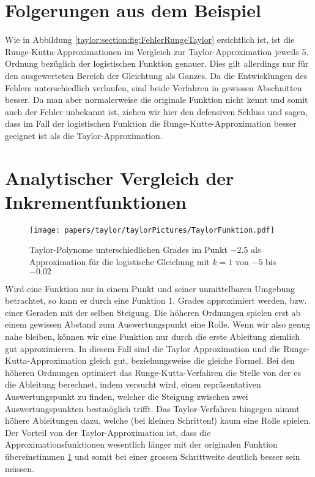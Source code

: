 %
%
%
\section{Folgerungen aus dem Beispiel
\label{taylor:section:folgerungen}}
Wie in Abbildung \ref{taylor:section:fig:FehlerRungeTaylor} ersichtlich ist, ist die Runge-Kutta-Approximationen im Vergleich zur Taylor-Approximation jeweils 5. Ordnung bezüglich der logistischen Funktion genauer.
Dies gilt allerdings nur für den ausgewerteten Bereich der Gleichtung als Ganzes.
Da die Entwicklungen des Fehlers unterschiedlich verlaufen, sind beide Verfahren in gewissen Abschnitten besser.
Da man aber normalerweise die originale Funktion nicht kennt und somit auch der Fehler unbekannt ist, ziehen wir hier den defensiven Schluss und sagen, dass im Fall der logistischen Funktion die Runge-Kutte-Approximation besser geeignet ist als die Taylor-Approximation.

\section{Analytischer Vergleich der Inkrementfunktionen
\label{taylor:subsection:VergleichInkrementft}}
\begin{figure}
\begin{center}
\texttt{[image: papers/taylor/taylorPictures/TaylorFunktion.pdf]}
\caption{Taylor-Polynome unterschiedlichen Grades im Punkt $-2.5$ als
Approximation für die logistische Gleichung mit $k=1$ von $-5$ bis $-0.02$}
\label{taylor:section:fig:TaylorFunktion}
\end{center}
\end{figure}%
Wird eine Funktion nur in einem Punkt und seiner unmittelbaren Umgebung betrachtet, so kann er durch eine Funktion 1. Grades approximiert werden, bzw. einer Geraden mit der selben Steigung.
Die höheren Ordnungen spielen erst ab einem gewissen Abstand zum Auswertungspunkt eine Rolle.
Wenn wir also genug nahe bleiben, können wir eine Funktion nur durch die erste Ableitung ziemlich gut approximieren.
In diesem Fall sind die Taylor Approximation und die Runge-Kutta-Approximation gleich gut, beziehungsweise die gleiche Formel.
Bei den höheren Ordnungen optimiert das Runge-Kutta-Verfahren die Stelle von der es die Ableitung berechnet, indem versucht wird, einen repräsentativen Auswertungspunkt zu finden, welcher die Steigung zwischen zwei Auswertungspunkten bestmöglich trifft.
Das Taylor-Verfahren hingegen nimmt höhere Ableitungen dazu, welche (bei kleinen Schritten!) kaum eine Rolle spielen. 
Der Vorteil von der Taylor-Approximation ist, dass die Approximationsfunktionen wesentlich länger mit der originalen Funktion übereinstimmen \ref{taylor:section:fig:TaylorFunktion} und somit bei einer grossen Schrittweite deutlich besser sein müssen.

